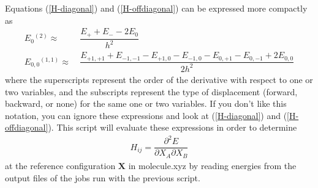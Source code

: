 \documentclass[11pt]{article}
\newcommand{\ttf}[1]{{\ttfamily #1}}
\newcommand{\bo}[1]{\ensuremath{\mathbf{#1}}}
\newcommand{\pt}{\partial}
\newcommand{\fr}[2]{\dfrac{#1}{#2}}
\newcommand{\ord}[1]{\ensuremath{^{(#1)}}}
\begin{document}
Equations (\ref{H-diagonal}) and (\ref{H-offdiagonal}) can be expressed more compactly as
\begin{align}
	E_0\ord{2} \approx&\ 
	\fr{E_{+}+E_{-}-2E_0}{h^2} \\
	E_{0,0}\ord{1,1} \approx&\ 
	\fr{E_{+1,+1}+E_{-1,-1}-E_{+1,0}-E_{-1,0}-E_{0,+1}-E_{0,-1}+2E_{0,0}}{2h^2}
\end{align}
where the superscripts represent the order of the derivative with respect to one or two variables, and the subscripts represent the type of displacement (forward, backward, or none) for the same one or two variables.
If you don't like this notation, you can ignore these expressions and look at (\ref{H-diagonal}) and (\ref{H-offdiagonal}).
This script will evaluate these expressions in order to determine
\begin{align*}
	H_{ij} = \fr{\pt^2E}{\pt X_A\pt X_B}
\end{align*}
at the reference configuration $\bo{X}$ in \ttf{molecule.xyz} by reading energies from the output files of the jobs run with the previous script.
\end{document}
